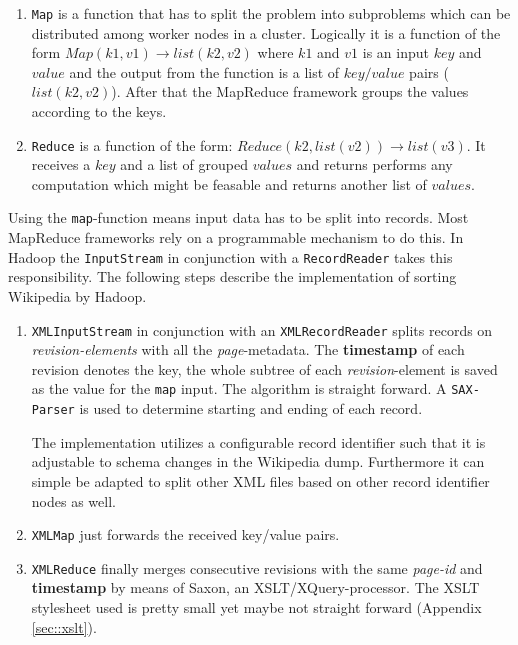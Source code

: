 \begin{enumerate}
\item \texttt{Map} is a function that has to split the problem into subproblems which can be distributed among worker nodes in a cluster. Logically it is a function of the form $Map(k1,v1) \rightarrow list(k2,v2)$ where $k1$ and $v1$ is an input $key$ and $value$ and the output from the function is a list of $key/value$ pairs ($list(k2, v2)$). After that the MapReduce framework groups the values according to the keys.
\item \texttt{Reduce} is a function of the form: $Reduce(k2, list (v2)) \rightarrow list(v3)$. It receives a $key$ and a list of grouped $values$ and returns performs any computation which might be feasable and returns another list of $values$.
\end{enumerate}

Using the \texttt{map}-function means input data has to be split into records. Most MapReduce frameworks rely on a programmable mechanism to do this. In Hadoop the \texttt{InputStream} in conjunction with a \texttt{RecordReader} takes this responsibility. The following steps describe the implementation of sorting Wikipedia by Hadoop.

\begin{enumerate}
\item \texttt{XMLInputStream} in conjunction with an \texttt{XMLRecordReader} splits records on \emph{revision-elements} with all the \emph{page}-metadata. The \textbf{timestamp} of each revision denotes the key, the whole subtree of each \emph{revision}-element is saved as the value for the \texttt{map} input. The algorithm is straight forward. A \texttt{SAX-Parser} is used to determine starting and ending of each record.

The implementation utilizes a configurable record identifier such that it is adjustable to schema changes in the Wikipedia dump. Furthermore it can simple be adapted to split other XML files based on other record identifier nodes as well.

\item \texttt{XMLMap} just forwards the received key/value pairs.
\item \texttt{XMLReduce} finally merges consecutive revisions with the same \emph{page-id} and \textbf{timestamp} by means of Saxon, an XSLT/XQuery-processor. The XSLT stylesheet used is pretty small yet maybe not straight forward (Appendix \ref{sec::xslt}).
\end{enumerate}


